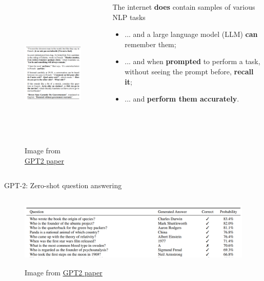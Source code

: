 \documentclass[12pt,aspectratio=169,handout]{beamer}
\begin{document}
\begin{frame}%
	\begin{columns}[T] %
		\begin{column}{.48\textwidth}
	\begin{figure}[h]
		\includegraphics[height=7.3cm]{gpt2-demonstrations}
		\caption*{Image from \href{https://cdn.openai.com/better-language-models/language_models_are_unsupervised_multitask_learners.pdf}{\underline{GPT2 paper}}}
	\end{figure}
\end{column}
	
\begin{column}{.48\textwidth}
	\vspace{1.5em}
	The internet \textbf{does} contain samples of various NLP tasks
	\pause
	\begin{itemize}
		\item ... and a large language model (LLM) \textbf{can} remember them;
		\pause
		\item ... and when \textbf{prompted} to perform a task, without seeing the prompt before, \textbf{recall it};
		\pause
		\item ... and \textbf{perform them accurately}.
	\end{itemize}
\end{column}
\end{columns}
	
\end{frame}

\begin{frame}{GPT-2: Zero-shot question answering}
	\begin{figure}[h]
		\includegraphics[height=3.5cm]{gpt2-zeroshot-qa}
		\caption*{Image from \href{https://cdn.openai.com/better-language-models/language_models_are_unsupervised_multitask_learners.pdf}{\underline{GPT2 paper}}}
	\end{figure}
\end{frame}
\end{document}
